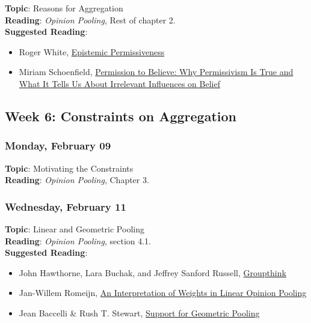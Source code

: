 \documentclass[
  letterpaper,
  DIV=11,
  numbers=noendperiod]{scrartcl}
\providecommand{\tightlist}{%
  \setlength{\itemsep}{0pt}\setlength{\parskip}{0pt}}
\begin{document}
\textbf{Topic}: Reasons for Aggregation\\
\textbf{Reading}: \emph{Opinion Pooling}, Rest of chapter 2.\\
\textbf{Suggested Reading}:

\begin{itemize}
\tightlist
\item
  Roger White,
  \href{https://philpapers.org/go.pl?id=WHIEP&proxyId=&u=http\%3A\%2F\%2Fweb.mit.edu\%2Frog\%2Fwww\%2Fpapers\%2FEP.pdf}{Epistemic
  Permissiveness}
\item
  Miriam Schoenfield,
  \href{https://philpapers.org/go.pl?id=SCHPTB&proxyId=&u=https\%3A\%2F\%2Fphilpapers.org\%2Farchive\%2FSCHPTB.pdf}{Permission
  to Believe: Why Permissivism Is True and What It Tells Us About
  Irrelevant Influences on Belief}
\end{itemize}

\subsection{Week 6: Constraints on
Aggregation}\label{week-6-constraints-on-aggregation}

\subsubsection{Monday, February 09}\label{monday-february-09}

\textbf{Topic}: Motivating the Constraints\\
\textbf{Reading}: \emph{Opinion Pooling}, Chapter 3.

\subsubsection{Wednesday, February 11}\label{wednesday-february-11}

\textbf{Topic}: Linear and Geometric Pooling\\
\textbf{Reading}: \emph{Opinion Pooling}, section 4.1.\\
\textbf{Suggested Reading}:

\begin{itemize}
\tightlist
\item
  John Hawthorne, Lara Buchak, and Jeffrey Sanford Russell,
  \href{https://philpapers.org/go.pl?id=RUSG&proxyId=&u=https\%3A\%2F\%2Fphilpapers.org\%2Farchive\%2FRUSG.pdf}{Groupthink}
\item
  Jan-Willem Romeijn,
  \href{https://philpapers.org/go.pl?id=ROMAIO&proxyId=&u=https\%3A\%2F\%2Fdx.doi.org\%2F10.1017\%2Fepi.2020.45}{An
  Interpretation of Weights in Linear Opinion Pooling}
\item
  Jean Baccelli \& Rush T. Stewart,
  \href{https://philpapers.org/go.pl?id=BACSFG&proxyId=&u=https\%3A\%2F\%2Fphilpapers.org\%2Farchive\%2FBACSFG.pdf}{Support
  for Geometric Pooling}
\end{itemize}
\end{document}
